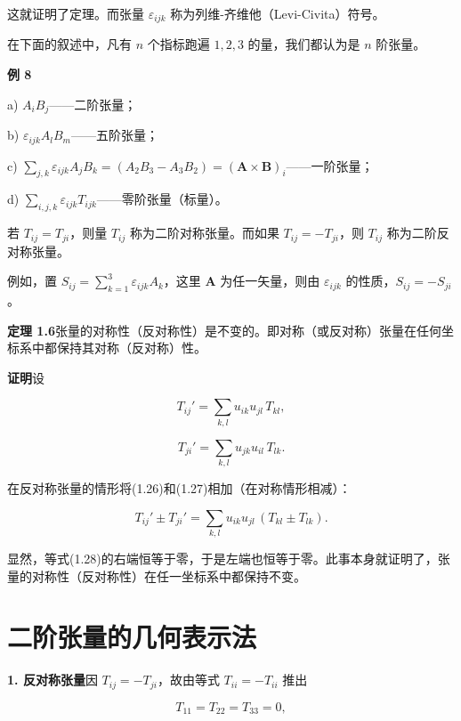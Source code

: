 \documentclass[11pt,a4paper,oneside]{ctexbook}
\newcommand{\ve}[1]{\bm{#1}}
\begin{document}
这就证明了定理。而张量 $\varepsilon_{ijk}$ 称为列维-齐维他（Levi-Civita）符号。

在下面的叙述中，凡有 $n$ 个指标跑遍 $1, 2, 3$ 的量，我们都认为是 $n$ 阶张量。

\textbf{例 8}

a) $A_i B_j$——二阶张量；

b) $\varepsilon_{ijk} A_l B_m$——五阶张量；

c) $\sum_{j,k} \varepsilon_{ijk} A_j B_k = (A_2 B_3 - A_3 B_2) = (\ve{A} \times \ve{B})_i$——一阶张量；

d) $\sum_{i,j,k} \varepsilon_{ijk} T_{ijk}$——零阶张量（标量）。

若 $T_{ij} = T_{ji}$，则量 $T_{ij}$ 称为二阶对称张量。而如果 $T_{ij} = -T_{ji}$，则 $T_{ij}$ 称为二阶反对称张量。

例如，置 $S_{ij} = \sum_{k=1}^{3} \varepsilon_{ijk} A_k$，这里 $\ve{A}$ 为任一矢量，则由 $\varepsilon_{ijk}$ 的性质，$S_{ij} = -S_{ji}$。

\textbf{定理 1.6}\quad 张量的对称性（反对称性）是不变的。即对称（或反对称）张量在任何坐标系中都保持其对称（反对称）性。

\textbf{证明}\quad 设

\begin{equation}
T_{ij}' = \sum_{k,l} u_{ik} u_{jl}\, T_{kl},
\tag{1.26}
\end{equation}

\begin{equation}
T_{ji}' = \sum_{k,l} u_{jk} u_{il}\, T_{lk}.
\tag{1.27}
\end{equation}

在反对称张量的情形将(1.26)和(1.27)相加（在对称情形相减）：

\begin{equation}
T_{ij}' \pm T_{ji}' = \sum_{k,l} u_{ik} u_{jl}\, (T_{kl} \pm T_{lk}).
\tag{1.28}
\end{equation}

显然，等式(1.28)的右端恒等于零，于是左端也恒等于零。此事本身就证明了，张量的对称性（反对称性）在任一坐标系中都保持不变。

\section{二阶张量的几何表示法}

\textbf{1. 反对称张量}\quad 因 $T_{ij} = -T_{ji}$，故由等式 $T_{ii} = -T_{ii}$ 推出

\begin{equation*}
T_{11} = T_{22} = T_{33} = 0,
\end{equation*}
\end{document}

